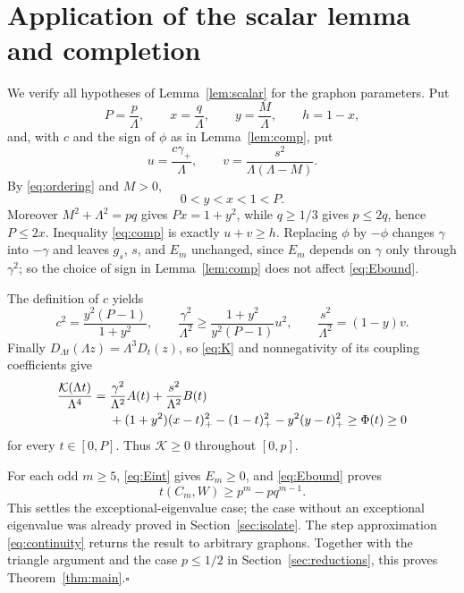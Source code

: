 \documentclass[11pt]{article}
\numberwithin{equation}{section}
\theoremstyle{remark}
\begin{document}
\section{Application of the scalar lemma and completion}
We verify all hypotheses of Lemma~\ref{lem:scalar} for the graphon parameters. Put
\begin{equation}\label{eq:normalizeapplication}
 P=\frac p\Lambda,\qquad x=\frac q\Lambda,\qquad
 y=\frac M\Lambda,\qquad h=1-x,
\end{equation}
and, with $c$ and the sign of $\phi$ as in Lemma~\ref{lem:comp}, put
\begin{equation}\label{eq:normalizecoupling}
 u=\frac{c\gamma_+}{\Lambda},\qquad
 v=\frac{s^2}{\Lambda(\Lambda-M)}.
\end{equation}
By \eqref{eq:ordering} and $M>0$,
\[
 0<y<x<1<P.
\]
Moreover $M^2+\Lambda^2=pq$ gives $Px=1+y^2$, while $q\ge1/3$ gives $p\le2q$, hence $P\le2x$. Inequality \eqref{eq:comp} is exactly $u+v\ge h$. Replacing $\phi$ by $-\phi$ changes $\gamma$ into $-\gamma$ and leaves $g_s$, $s$, and $E_m$ unchanged, since $E_m$ depends on $\gamma$ only through $\gamma^2$; so the choice of sign in Lemma~\ref{lem:comp} does not affect \eqref{eq:Ebound}.

The definition of $c$ yields
\[
 c^2=\frac{y^2(P-1)}{1+y^2},\qquad
 \frac{\gamma^2}{\Lambda^2}\ge
 \frac{1+y^2}{y^2(P-1)}u^2,\qquad
 \frac{s^2}{\Lambda^2}=(1-y)v.
\]
Finally $D_{\Lambda t}(\Lambda z)=\Lambda^3D_t(z)$, so \eqref{eq:K} and nonnegativity of its coupling coefficients give
\begin{align*}
 \frac{\mathcal K(\Lambda t)}{\Lambda^4}
 ={}&\frac{\gamma^2}{\Lambda^2}A(t)+\frac{s^2}{\Lambda^2}B(t)\notag\\
 &+(1+y^2)(x-t)_+^2-(1-t)_+^2-y^2(y-t)_+^2
 \ge\Phi(t)\ge0
\end{align*}
for every $t\in[0,P]$. Thus $\mathcal K\ge0$ throughout $[0,p]$.

For each odd $m\ge5$, \eqref{eq:Eint} gives $E_m\ge0$, and \eqref{eq:Ebound} proves
\[
 t(C_m,W)\ge p^m-pq^{m-1}.
\]
This settles the exceptional-eigenvalue case; the case without an exceptional eigenvalue was already proved in Section~\ref{sec:isolate}. The step approximation \eqref{eq:continuity} returns the result to arbitrary graphons. Together with the triangle argument and the case $p\le1/2$ in Section~\ref{sec:reductions}, this proves Theorem~\ref{thm:main}.\hfill$\square$
\end{document}
